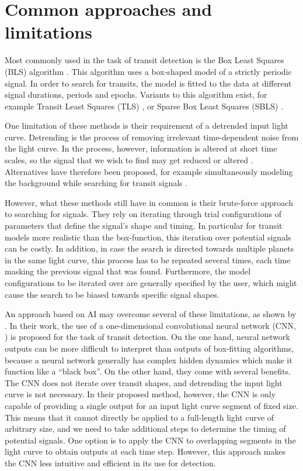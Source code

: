 
\section{Common approaches and limitations}
\label{sec:approaches}

Most commonly used in the task of transit detection is the Box Least Squares (BLS) algorithm \citep{kovacs2002box}. This algorithm uses a box-shaped model of a strictly periodic signal. In order to search for transits, the model is fitted to the data at different signal durations, periods and epochs. Variants to this algorithm exist, for example Transit Least Squares (TLS) \citep{hippke2019optimized}, or Sparse Box Least Squares (SBLS) \citep{panahi2021sparse}.

One limitation of these methods is their requirement of a detrended input light curve. Detrending is the process of removing irrelevant time-dependent noise from the light curve. In the process, however, information is altered at short time scales, so the signal that we wish to find may get reduced or altered \citep{hippke2019wotan}.  Alternatives have therefore been proposed, for example simultaneously modeling the background while searching for transit signals \cite{foreman2015systematic}.

However, what these methods still have in common is their brute-force approach to searching for signals. 
They rely on iterating through trial configurations of parameters that define the signal's shape and timing. In particular for transit models more realistic than the box-function, this iteration over potential signals can be costly. In addition, in case the search is directed towards multiple planets in the same light curve, this process has to be repeated several times, each time masking the previous signal that was found. Furthermore, the model configurations to be iterated over are generally specified by the user, which might cause the search to be biased towards specific signal shapes.

An approach based on AI may overcome several of these limitations, as shown by \cite{pearson2018searching}. In their work, the use of a one-dimensional convolutional neural network (CNN, \cite{lecun1989backpropagation}) is proposed for the task of transit detection. On the one hand, neural network outputs can be more difficult to interpret than outputs of box-fitting algorithms, because a neural network generally has complex hidden dynamics which make it function like a ``black box''. On the other hand, they come with several benefits. The CNN does not iterate over transit shapes, and detrending the input light curve is not necessary. 
In their proposed method, however, the CNN is only capable of providing a single output for an input light curve segment of fixed size. 
This means that it cannot directly be applied to a full-length light curve of arbitrary size, and we need to take additional steps to determine the timing of potential signals. One option is to apply the CNN to overlapping segments in the light curve to obtain outputs at each time step. However, this approach makes the CNN less intuitive and efficient in its use for detection. 

